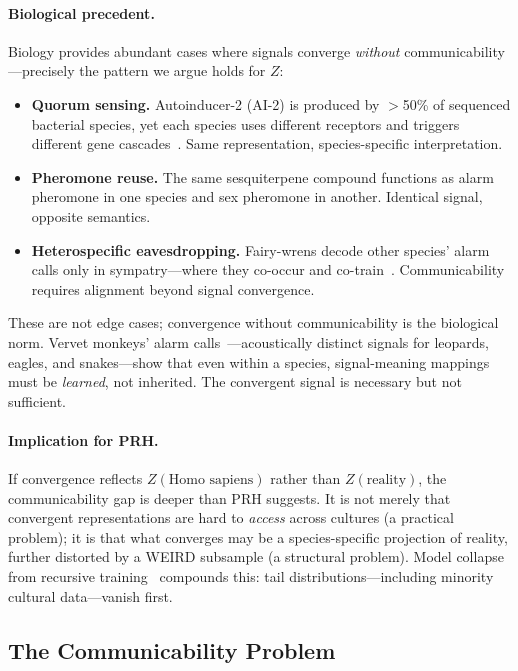 \documentclass{article}
\theoremstyle{definition}
\begin{document}
\paragraph{Biological precedent.}
Biology provides abundant cases where signals converge \emph{without} communicability---precisely the pattern we argue holds for $Z$:
\begin{itemize}[nosep]
  \item \textbf{Quorum sensing.} Autoinducer-2 (AI-2) is produced by $>$50\% of sequenced bacterial species, yet each species uses different receptors and triggers different gene cascades~\citep{waters2005quorum}. Same representation, species-specific interpretation.
  \item \textbf{Pheromone reuse.} The same sesquiterpene compound functions as alarm pheromone in one species and sex pheromone in another. Identical signal, opposite semantics.
  \item \textbf{Heterospecific eavesdropping.} Fairy-wrens decode other species' alarm calls only in sympatry---where they co-occur and co-train~\citep{magrath2015eavesdropping}. Communicability requires alignment beyond signal convergence.
\end{itemize}
These are not edge cases; convergence without communicability is the biological norm. Vervet monkeys' alarm calls~\citep{seyfarth1980vervet}---acoustically distinct signals for leopards, eagles, and snakes---show that even within a species, signal-meaning mappings must be \emph{learned}, not inherited. The convergent signal is necessary but not sufficient.

\paragraph{Implication for PRH.}
If convergence reflects $Z(\text{Homo sapiens})$ rather than $Z(\text{reality})$, the communicability gap is deeper than PRH suggests. It is not merely that convergent representations are hard to \emph{access} across cultures (a practical problem); it is that what converges may be a species-specific projection of reality, further distorted by a WEIRD subsample (a structural problem). Model collapse from recursive training~\citep{shumailov2024collapse} compounds this: tail distributions---including minority cultural data---vanish first.

\subsection{The Communicability Problem}\label{sec:communicability}
\end{document}
